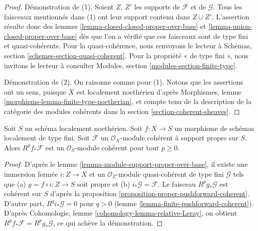 \begin{proof}
Démonstration de (1). Soient $Z$, $Z'$ les supports de $\mathcal{F}$
et de $\mathcal{G}$. Tous les faisceaux mentionnés dans (1) ont
leur support contenu dans $Z \cup Z'$. L'assertion résulte
donc des lemmes \ref{lemma-closed-closed-proper-over-base} et
\ref{lemma-union-closed-proper-over-base}
dès que l'on a vérifié que ces faisceaux sont de type
fini et quasi-cohérents. Pour la quasi-cohérence, nous renvoyons le lecteur à
Schémas, section \ref{schemes-section-quasi-coherent}.
Pour la propriété « de type fini », nous invitons le lecteur à consulter
Modules, section \ref{modules-section-finite-type}.

\medskip\noindent
Démonstration de (2). On raisonne comme pour (1). Notons que les assertions
ont un sens, puisque $X$ est localement noethérien d'après
Morphismes, lemme \ref{morphisms-lemma-finite-type-noetherian},
et compte tenu de la description de la catégorie des modules
cohérents dans la section \ref{section-coherent-sheaves}.
\end{proof}

\begin{lemma}
\label{lemma-support-proper-over-base-pushforward}
Soit $S$ un schéma localement noethérien.
Soit $f : X \to S$ un morphisme de schémas localement de type fini.
Soit $\mathcal{F}$ un $\mathcal{O}_X$-module
cohérent à support propre sur $S$. Alors $R^pf_*\mathcal{F}$
est un $\mathcal{O}_S$-module cohérent pour tout $p \geq 0$.
\end{lemma}

\begin{proof}
D'après le lemme \ref{lemma-module-support-proper-over-base},
il existe une immersion fermée $i : Z \to X$ et
un $\mathcal{O}_Z$-module quasi-cohérent de type fini
$\mathcal{G}$ tels que (a) $g = f \circ i : Z \to S$ soit propre et (b)
$i_*\mathcal{G} = \mathcal{F}$.
Le faisceau $R^pg_*\mathcal{G}$ est cohérent sur $S$ d'après la
proposition \ref{proposition-proper-pushforward-coherent}.
D'autre part, $R^qi_*\mathcal{G} = 0$ pour $q > 0$
(lemme \ref{lemma-finite-pushforward-coherent}).
D'après Cohomologie, lemme \ref{cohomology-lemma-relative-Leray},
on obtient $R^pf_*\mathcal{F} = R^pg_*\mathcal{G}$, ce qui achève la démonstration.
\end{proof}

